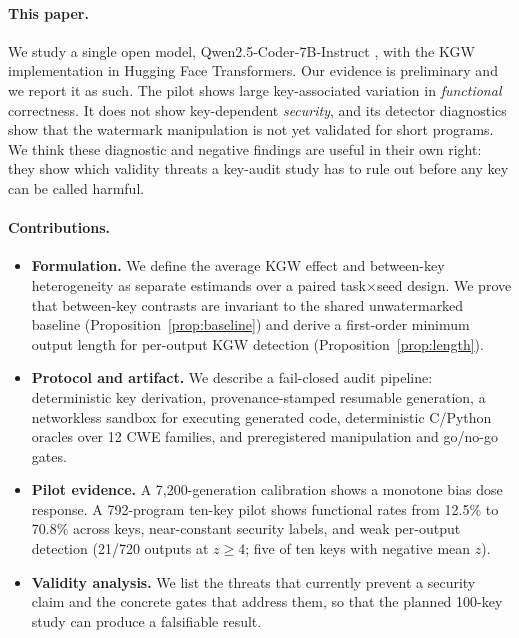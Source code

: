 \paragraph{This paper.} We study a single open model, Qwen2.5-Coder-7B-Instruct \citep{hui2024qwen25coder}, with the KGW implementation in Hugging Face Transformers. Our evidence is preliminary and we report it as such. The pilot shows large key-associated variation in \emph{functional} correctness. It does not show key-dependent \emph{security}, and its detector diagnostics show that the watermark manipulation is not yet validated for short programs. We think these diagnostic and negative findings are useful in their own right: they show which validity threats a key-audit study has to rule out before any key can be called harmful.

\paragraph{Contributions.}
\begin{itemize}
\item \textbf{Formulation.} We define the average KGW effect and between-key heterogeneity as separate estimands over a paired task$\times$seed design. We prove that between-key contrasts are invariant to the shared unwatermarked baseline (Proposition~\ref{prop:baseline}) and derive a first-order minimum output length for per-output KGW detection (Proposition~\ref{prop:length}).
\item \textbf{Protocol and artifact.} We describe a fail-closed audit pipeline: deterministic key derivation, provenance-stamped resumable generation, a networkless sandbox for executing generated code, deterministic C/Python oracles over 12 CWE families, and preregistered manipulation and go/no-go gates.
\item \textbf{Pilot evidence.} A 7,200-generation calibration shows a monotone bias dose response. A 792-program ten-key pilot shows functional rates from 12.5\% to 70.8\% across keys, near-constant security labels, and weak per-output detection (21/720 outputs at $z\!\ge\!4$; five of ten keys with negative mean $z$).
\item \textbf{Validity analysis.} We list the threats that currently prevent a security claim and the concrete gates that address them, so that the planned 100-key study can produce a falsifiable result.
\end{itemize}
